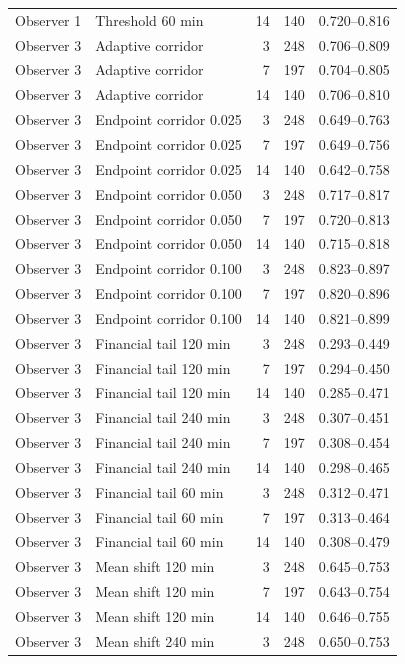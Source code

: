 \documentclass[a4paper,11pt]{article}
\begin{document}
{\begin{longtable}[]{@{}llrrl@{}}
Observer 1 & Threshold 60 min & 14 & 140 & 0.720--0.816 \\
Observer 3 & Adaptive corridor & 3 & 248 & 0.706--0.809 \\
Observer 3 & Adaptive corridor & 7 & 197 & 0.704--0.805 \\
Observer 3 & Adaptive corridor & 14 & 140 & 0.706--0.810 \\
Observer 3 & Endpoint corridor 0.025 & 3 & 248 & 0.649--0.763 \\
Observer 3 & Endpoint corridor 0.025 & 7 & 197 & 0.649--0.756 \\
Observer 3 & Endpoint corridor 0.025 & 14 & 140 & 0.642--0.758 \\
Observer 3 & Endpoint corridor 0.050 & 3 & 248 & 0.717--0.817 \\
Observer 3 & Endpoint corridor 0.050 & 7 & 197 & 0.720--0.813 \\
Observer 3 & Endpoint corridor 0.050 & 14 & 140 & 0.715--0.818 \\
Observer 3 & Endpoint corridor 0.100 & 3 & 248 & 0.823--0.897 \\
Observer 3 & Endpoint corridor 0.100 & 7 & 197 & 0.820--0.896 \\
Observer 3 & Endpoint corridor 0.100 & 14 & 140 & 0.821--0.899 \\
Observer 3 & Financial tail 120 min & 3 & 248 & 0.293--0.449 \\
Observer 3 & Financial tail 120 min & 7 & 197 & 0.294--0.450 \\
Observer 3 & Financial tail 120 min & 14 & 140 & 0.285--0.471 \\
Observer 3 & Financial tail 240 min & 3 & 248 & 0.307--0.451 \\
Observer 3 & Financial tail 240 min & 7 & 197 & 0.308--0.454 \\
Observer 3 & Financial tail 240 min & 14 & 140 & 0.298--0.465 \\
Observer 3 & Financial tail 60 min & 3 & 248 & 0.312--0.471 \\
Observer 3 & Financial tail 60 min & 7 & 197 & 0.313--0.464 \\
Observer 3 & Financial tail 60 min & 14 & 140 & 0.308--0.479 \\
Observer 3 & Mean shift 120 min & 3 & 248 & 0.645--0.753 \\
Observer 3 & Mean shift 120 min & 7 & 197 & 0.643--0.754 \\
Observer 3 & Mean shift 120 min & 14 & 140 & 0.646--0.755 \\
Observer 3 & Mean shift 240 min & 3 & 248 & 0.650--0.753 \\

\end{longtable}}
\end{document}
